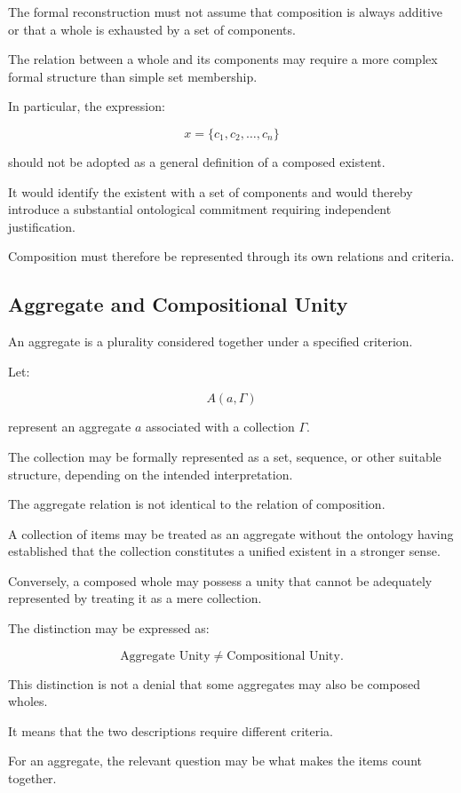 The formal reconstruction must not assume
that composition is always additive or
that a whole is exhausted by a set of
components.

The relation between a whole and its
components may require a more complex
formal structure than simple set membership.

In particular, the expression:

\[
    x = \{c_1,c_2,\ldots,c_n\}
\]

should not be adopted as a general
definition of a composed existent.

It would identify the existent with a
set of components and would thereby
introduce a substantial ontological
commitment requiring independent
justification.

Composition must therefore be represented
through its own relations and criteria.

\subsection{Aggregate and Compositional Unity}

An aggregate is a plurality considered
together under a specified criterion.

Let:

\[
    A(a,\Gamma)
\]

represent an aggregate \(a\) associated
with a collection \(\Gamma\).

The collection may be formally represented
as a set, sequence, or other suitable
structure, depending on the intended
interpretation.

The aggregate relation is not identical
to the relation of composition.

A collection of items may be treated as
an aggregate without the ontology having
established that the collection constitutes
a unified existent in a stronger sense.

Conversely, a composed whole may possess
a unity that cannot be adequately represented
by treating it as a mere collection.

The distinction may be expressed as:

\[
    \text{Aggregate Unity}
    \neq
    \text{Compositional Unity}.
\]

This distinction is not a denial that
some aggregates may also be composed
wholes.

It means that the two descriptions
require different criteria.

For an aggregate, the relevant question
may be what makes the items count together.

